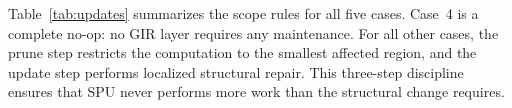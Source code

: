Table~\ref{tab:updates} summarizes the scope rules for all five cases.
Case~4 is a complete no-op: no GIR layer requires any maintenance.
For all other cases, the prune step restricts the computation to the smallest affected region, and the update step performs localized structural repair.
This three-step discipline ensures that SPU never performs more work than the structural change requires.
